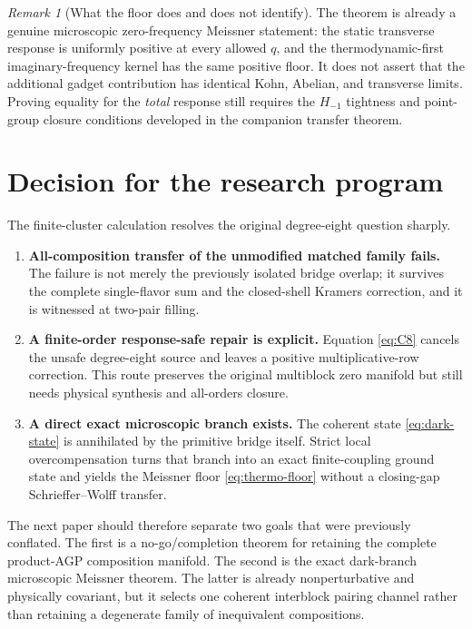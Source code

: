 \documentclass[11pt]{article}
\theoremstyle{definition}
\theoremstyle{remark}
\newtheorem{remark}[theorem]{Remark}
\begin{document}
\begin{remark}[What the floor does and does not identify]
The theorem is already a genuine microscopic zero-frequency Meissner statement: the static transverse response is uniformly positive at every allowed $q$, and the thermodynamic-first imaginary-frequency kernel has the same positive floor.  It does not assert that the additional gadget contribution has identical Kohn, Abelian, and transverse limits.  Proving equality for the \emph{total} response still requires the $H_{-1}$ tightness and point-group closure conditions developed in the companion transfer theorem.
\end{remark}

\section{Decision for the research program}

The finite-cluster calculation resolves the original degree-eight question sharply.

\begin{enumerate}
\item \textbf{All-composition transfer of the unmodified matched family fails.}  The failure is not merely the previously isolated bridge overlap; it survives the complete single-flavor sum and the closed-shell Kramers correction, and it is witnessed at two-pair filling.
\item \textbf{A finite-order response-safe repair is explicit.}  Equation \eqref{eq:C8} cancels the unsafe degree-eight source and leaves a positive multiplicative-row correction.  This route preserves the original multiblock zero manifold but still needs physical synthesis and all-orders closure.
\item \textbf{A direct exact microscopic branch exists.}  The coherent state \eqref{eq:dark-state} is annihilated by the primitive bridge itself.  Strict local overcompensation turns that branch into an exact finite-coupling ground state and yields the Meissner floor \eqref{eq:thermo-floor} without a closing-gap Schrieffer--Wolff transfer.
\end{enumerate}

The next paper should therefore separate two goals that were previously conflated.  The first is a no-go/completion theorem for retaining the complete product-AGP composition manifold.  The second is the exact dark-branch microscopic Meissner theorem.  The latter is already nonperturbative and physically covariant, but it selects one coherent interblock pairing channel rather than retaining a degenerate family of inequivalent compositions.
\end{document}
